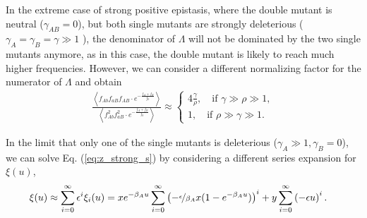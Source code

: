 \documentclass[aps,rmp,twocolumn,groupedaddress,floatfix,notitlepage]{revtex4-1}
\begin{document}
In the extreme case of strong positive epistasis, where the double mutant is neutral ($\gamma_{AB} = 0 $), but both single mutants are strongly deleterious ($\gamma_A = \gamma_B = \gamma \gg 1$ ), the denominator of $\Lambda$ will not be dominated by the two single mutants anymore, as in this case, the double mutant is likely to reach much higher frequencies. However, we can consider a different normalizing factor for the numerator of $\Lambda$ and obtain 
\begin{align}
    \frac{\left\langle f_{Ab}f_{aB}f_{AB}\cdot e^{-\frac{f_{A}+f_{B}}{f_0}}\right\rangle}{\left\langle f_{Ab}^2f_{aB}^2\cdot e^{-\frac{f_{A}+f_{B}}{f_0}}\right\rangle} \approx
    \begin{cases}
        4 \frac{\gamma}{\rho}, \quad \text{if $\gamma \gg \rho \gg1$}, \\
        1, \quad \text{if $\rho \gg \gamma \gg 1$}.
    \end{cases}
\end{align}


In the limit that only one of the single mutants is deleterious ($\gamma_A \gg 1,\gamma_B =0$), we can solve Eq. (\ref{eq:z_strong_s}) by considering a different series expansion for $\xi(u)$,
\begin{align}
    \xi (u) &\approx \sum_{i=0}^\infty \epsilon^i \xi_i (u) = xe^{-\beta_A u} \sum_{i=0}^\infty \left(-\nicefrac{\epsilon}{\beta_A}x(1-e^{-\beta_A u})\right)^i
    + y \sum_{i=0}^\infty \left(-\epsilon u\right)^i
    .\label{eq:f(u)_series}
\end{align}
\end{document}

